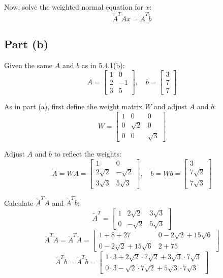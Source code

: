 \documentclass[12pt]{article}
\begin{document}
Now, solve the weighted normal equation for \( x \):
\[
  \tilde{A}^T \tilde{A} x = \tilde{A}^T \tilde{b}
\]

\pagebreak

\subsection*{Part (b)}
Given the same \( A \) and \( b \) as in 5.4.1(b):
\[
  A = \begin{bmatrix} 1 & 0 \\ 2 & -1 \\ 3 & 5 \end{bmatrix}, \quad b = \begin{bmatrix} 3 \\ 7 \\ 7 \end{bmatrix}
\]

As in part (a), first define the weight matrix \( W \) and adjust \( A \) and \( b \):
\[
  W = \begin{bmatrix} 1 & 0 & 0 \\ 0 & \sqrt{2} & 0 \\ 0 & 0 & \sqrt{3} \end{bmatrix}
\]

Adjust \( A \) and \( b \) to reflect the weights:
\[
  \tilde{A} = W A = \begin{bmatrix} 1 & 0 \\ 2\sqrt{2} & -\sqrt{2} \\ 3\sqrt{3} & 5\sqrt{3} \end{bmatrix}, \quad \tilde{b} = W b = \begin{bmatrix} 3 \\ 7\sqrt{2} \\ 7\sqrt{3} \end{bmatrix}
\]

Calculate \( \tilde{A}^T \tilde{A} \) and \( \tilde{A}^T \tilde{b} \):
\[
  \tilde{A}^T = \begin{bmatrix} 1 & 2\sqrt{2} & 3\sqrt{3} \\ 0 & -\sqrt{2} & 5\sqrt{3} \end{bmatrix}
\]
\[
  \tilde{A}^T \tilde{A} = \tilde{A}^T \tilde{A} = \begin{bmatrix} 1+8+27 & 0-2\sqrt{2}+15\sqrt{6} \\ 0-2\sqrt{2}+15\sqrt{6} & 2+75 \end{bmatrix}
\]
\[
  \tilde{A}^T \tilde{b} = \tilde{A}^T \tilde{b} = \begin{bmatrix} 1\cdot3 + 2\sqrt{2}\cdot7\sqrt{2} + 3\sqrt{3}\cdot7\sqrt{3} \\ 0\cdot3 - \sqrt{2}\cdot7\sqrt{2} + 5\sqrt{3}\cdot7\sqrt{3} \end{bmatrix}
\]
\end{document}
